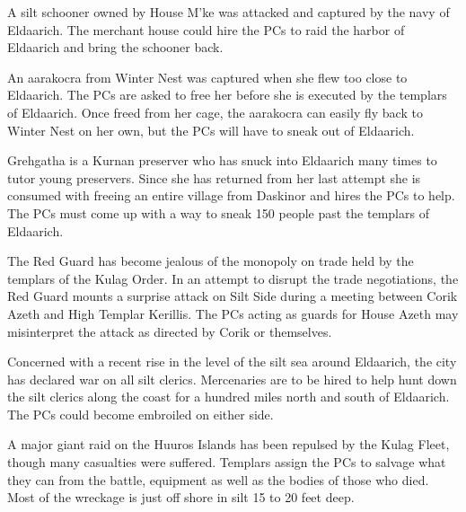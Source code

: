 {
	\item A silt schooner owned by House M'ke was attacked and captured by the navy of Eldaarich. The merchant house could hire the PCs to raid the harbor of Eldaarich and bring the schooner back.
	\item An aarakocra from Winter Nest was captured when she flew too close to Eldaarich. The PCs are asked to free her before she is executed by the templars of Eldaarich. Once freed from her cage, the aarakocra can easily fly back to Winter Nest on her own, but the PCs will have to sneak out of Eldaarich.
	\item Grehgatha is a Kurnan preserver who has snuck into Eldaarich many times to tutor young preservers. Since she has returned from her last attempt she is consumed with freeing an entire village from Daskinor and hires the PCs to help. The PCs must come up with a way to sneak 150 people past the templars of Eldaarich.
	\item The Red Guard has become jealous of the monopoly on trade held by the templars of the Kulag Order. In an attempt to disrupt the trade negotiations, the Red Guard mounts a surprise attack on Silt Side during a meeting between Corik Azeth and High Templar Kerillis. The PCs acting as guards for House Azeth may misinterpret the attack as directed by Corik or themselves.
	\item Concerned with a recent rise in the level of the silt sea around Eldaarich, the city has declared war on all silt clerics. Mercenaries are to be hired to help hunt down the silt clerics along the coast for a hundred miles north and south of Eldaarich. The PCs could become embroiled on either side.
	\item A major giant raid on the Huuros Islands has been repulsed by the Kulag Fleet, though many casualties were suffered. Templars assign the PCs to salvage what they can from the battle, equipment as well as the bodies of those who died. Most of the wreckage is just off shore in silt 15 to 20 feet deep.
}
